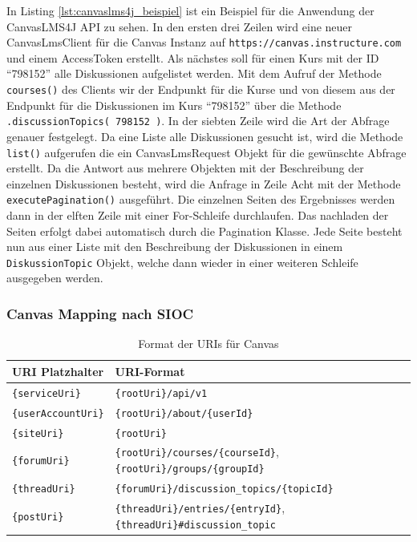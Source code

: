 In Listing \ref{lst:canvaslms4j_beispiel} ist ein Beispiel für die Anwendung der CanvasLMS4J API zu sehen. In den ersten drei Zeilen wird eine neuer CanvasLmsClient für die Canvas Instanz auf \texttt{https://canvas.instructure.com} und einem AccessToken erstellt. Als nächstes soll für einen Kurs mit der ID \enquote{798152} alle Diskussionen aufgelistet werden. Mit dem Aufruf der Methode \texttt{courses()} des Clients wir der Endpunkt für die Kurse und von diesem aus der Endpunkt für die Diskussionen im Kurs \enquote{798152} über die Methode \texttt{.discussionTopics( 798152 )}. In der siebten Zeile wird die Art der Abfrage genauer festgelegt. Da eine Liste alle Diskussionen gesucht ist, wird die Methode \texttt{list()} aufgerufen die ein CanvasLmsRequest Objekt für die gewünschte Abfrage erstellt. Da die Antwort aus mehrere Objekten mit der Beschreibung der einzelnen Diskussionen besteht, wird die Anfrage in Zeile Acht mit der Methode \texttt{executePagination()} ausgeführt. Die einzelnen Seiten des Ergebnisses werden dann in der elften Zeile mit einer For-Schleife durchlaufen. Das nachladen der Seiten erfolgt dabei automatisch durch die Pagination Klasse. Jede Seite besteht nun aus einer Liste mit den Beschreibung der Diskussionen in einem \texttt{DiskussionTopic} Objekt, welche dann wieder in einer weiteren Schleife ausgegeben werden.


\subsubsection{Canvas Mapping nach SIOC} %
\label{ssub:canvas_sioc_mapping}

\begin{table}[ht]
    \centering
    \caption{Format der URIs für Canvas}
    \begin{tabular}{l|p{11cm}}
        \textbf{URI Platzhalter} & URI-Format \\ 
        \hline
        \texttt{\{serviceUri\}} & 
        \texttt{\{rootUri\}/api/v1} \\

        \texttt{\{userAccountUri\}} & 
        \texttt{\{rootUri\}/about/\{userId\}} \\

        \texttt{\{siteUri\}} & 
        \texttt{\{rootUri\}} \\

        \texttt{\{forumUri\}} & 
        \texttt{\{rootUri\}/courses/\{courseId\}},
        \texttt{\{rootUri\}/groups/\{groupId\}} \\

        \texttt{\{threadUri\}} & 
        \texttt{\{forumUri\}/discussion\_topics/\{topicId\}} \\

        \texttt{\{postUri\}} & 
        \texttt{\{threadUri\}/entries/\{entryId\}},
        \texttt{\{threadUri\}\#discussion\_topic} \\
    \end{tabular}
    \label{tbl:canvas_uri_platzhalter}
\end{table}

